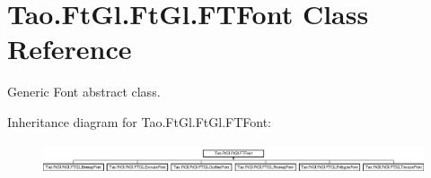 \hypertarget{class_tao_1_1_ft_gl_1_1_ft_gl_1_1_f_t_font}{
\section{Tao.FtGl.FtGl.FTFont Class Reference}
\label{class_tao_1_1_ft_gl_1_1_ft_gl_1_1_f_t_font}
}


Generic Font abstract class.  


Inheritance diagram for Tao.FtGl.FtGl.FTFont:\begin{figure}[H]
\begin{center}
\leavevmode
\includegraphics[height=0.928690cm]{class_tao_1_1_ft_gl_1_1_ft_gl_1_1_f_t_font}
\end{center}
\end{figure}
